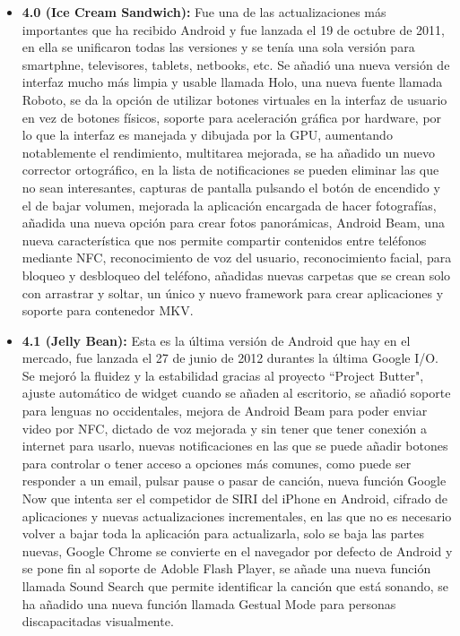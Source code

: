 \begin{itemize}
	\item \textbf{4.0 (Ice Cream Sandwich):} Fue una de las actualizaciones más importantes que ha recibido Android y fue lanzada el 19 de octubre de 2011, en ella se unificaron todas las versiones y se tenía una sola versión para smartphne, televisores, tablets, netbooks, etc. Se añadió una nueva versión de interfaz mucho más limpia y usable llamada Holo, una nueva fuente llamada Roboto, se da la opción de utilizar botones virtuales en la interfaz de usuario en vez de botones físicos, soporte para aceleración gráfica por hardware, por lo que la interfaz es manejada y dibujada por la GPU, aumentando notablemente el rendimiento, multitarea mejorada, se ha añadido un nuevo corrector ortográfico, en la lista de notificaciones se pueden eliminar las que no sean interesantes, capturas de pantalla pulsando el botón de encendido y el de bajar volumen, mejorada la aplicación encargada de hacer fotografías, añadida una nueva opción para crear fotos panorámicas, Android Beam, una nueva característica que nos permite compartir contenidos entre teléfonos mediante NFC, reconocimiento de voz del usuario, reconocimiento facial, para bloqueo y desbloqueo del teléfono, añadidas nuevas carpetas que se crean solo con arrastrar y soltar, un único y nuevo framework para crear aplicaciones y soporte para contenedor MKV.

	\item \textbf{4.1 (Jelly Bean):} Esta es la última versión de Android que hay en el mercado, fue lanzada el 27 de junio de 2012 durantes la última Google I/O. Se mejoró la fluidez y la estabilidad gracias al proyecto ``Project Butter", ajuste automático de widget cuando se añaden al escritorio, se añadió soporte para lenguas no occidentales, mejora de Android Beam para poder enviar video por NFC, dictado de voz mejorada y sin tener que tener conexión a internet para usarlo, nuevas notificaciones en las que se puede añadir botones para controlar o tener acceso a opciones más comunes, como puede ser responder a un email, pulsar pause o pasar de canción, nueva función Google Now que intenta ser el competidor de SIRI del iPhone en Android, cifrado de aplicaciones y nuevas actualizaciones incrementales, en las que no es necesario volver a bajar toda la aplicación para actualizarla, solo se baja las partes nuevas, Google Chrome se convierte en el navegador por defecto de Android y se pone fin al soporte de Adoble Flash Player, se añade una nueva función llamada Sound Search que permite identificar la canción que está sonando, se ha añadido una nueva función llamada Gestual Mode para personas discapacitadas visualmente.
\end{itemize}

